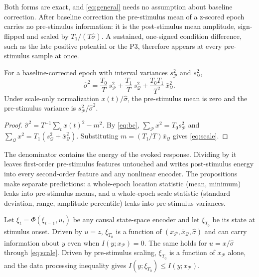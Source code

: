 Both forms are exact, and \eqref{eq:general} needs no assumption about baseline correction. After baseline correction the pre-stimulus mean of a z-scored epoch carries no pre-stimulus information: it is the post-stimulus mean amplitude, sign-flipped and scaled by $T_1/(T\hat\sigma)$. A sustained, one-signed condition difference, such as the late positive potential \cite{hajcak2010lpp} or the P3, therefore appears at every pre-stimulus sample at once.

\begin{proposition}\label{prop:scale}
For a baseline-corrected epoch with interval variances $s_\mathcal{P}^2$ and $s_\mathcal{Q}^2$,
\begin{equation}
\hat\sigma^2=\frac{T_0}{T}\,s_\mathcal{P}^2+\frac{T_1}{T}\,s_\mathcal{Q}^2+\frac{T_0T_1}{T^2}\,\bar{x}_\mathcal{Q}^2. \label{eq:scale}
\end{equation}
Under scale-only normalization $x(t)/\hat\sigma$, the pre-stimulus mean is zero and the pre-stimulus variance is $s_\mathcal{P}^2/\hat\sigma^2$.
\end{proposition}
\begin{proof}
$\hat\sigma^2=T^{-1}\sum_t x(t)^2-m^2$. By \eqref{eq:bc}, $\sum_\mathcal{P}x^2=T_0s_\mathcal{P}^2$ and $\sum_\mathcal{Q}x^2=T_1(s_\mathcal{Q}^2+\bar{x}_\mathcal{Q}^2)$. Substituting $m=(T_1/T)\bar{x}_\mathcal{Q}$ gives \eqref{eq:scale}.
\end{proof}

The denominator contains the energy of the evoked response. Dividing by it leaves first-order pre-stimulus features untouched and writes post-stimulus energy into every second-order feature and any nonlinear encoder. The propositions make separate predictions: a whole-epoch location statistic (mean, minimum) leaks into pre-stimulus means, and a whole-epoch scale statistic (standard deviation, range, amplitude percentile) leaks into pre-stimulus variances.

\begin{corollary}\label{cor:causal}
Let $\xi_t=\Phi(\xi_{t-1},u_t)$ be any causal state-space encoder and let $\xi_{T_0}$ be its state at stimulus onset. Driven by $u=z$, $\xi_{T_0}$ is a function of $(x_\mathcal{P},\bar{x}_\mathcal{Q},\hat\sigma)$ and can carry information about $y$ even when $I(y;x_\mathcal{P})=0$. The same holds for $u=x/\hat\sigma$ through \eqref{eq:scale}. Driven by pre-stimulus scaling, $\xi_{T_0}$ is a function of $x_\mathcal{P}$ alone, and the data processing inequality gives $I(y;\xi_{T_0})\le I(y;x_\mathcal{P})$.
\end{corollary}

